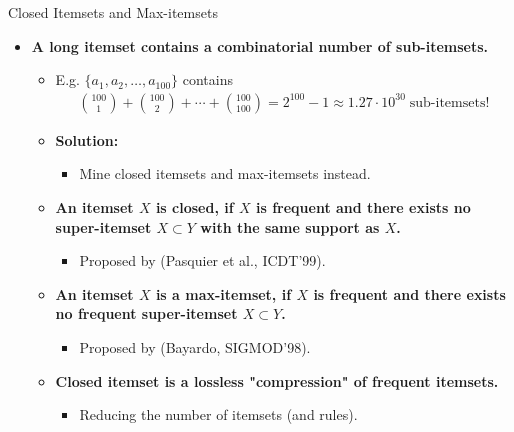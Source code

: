 \begin{frame}{Closed Itemsets and Max-itemsets}
	\begin{itemize}
		\item \textbf{A long itemset contains a combinatorial number of 
		sub-itemsets.}
		\begin{itemize}
			\item E.g. $\{a_1,a_2,\ldots,a_{100}\}$ contains
			\begin{align}
				{100\choose 1} + {100 \choose 2} + \cdots + {100 \choose 100} = 
				2^{100}-1 \approx 1.27 \cdot 10^{30} \; \text{sub-itemsets!} 
			\end{align}
			\item \textbf{Solution:}
			\begin{itemize}
				\item Mine closed itemsets and max-itemsets instead.
			\end{itemize}
			\item \textbf{An itemset $X$ is closed, if $X$ is frequent and 
			there exists no super-itemset $X \subset Y$ with the same support 
			as $X$.}
			\begin{itemize}
				\item Proposed by (Pasquier et al., ICDT'99).
			\end{itemize}
			\item \textbf{An itemset $X$ is a max-itemset, if $X$ is frequent 
			and there exists no frequent super-itemset $X \subset Y$.}
			\begin{itemize}
				\item Proposed by (Bayardo, SIGMOD'98).
			\end{itemize}
			\item \textbf{Closed itemset is a lossless "compression" of 
			frequent itemsets.}
			\begin{itemize}
				\item Reducing the number of itemsets (and rules).
			\end{itemize}
		\end{itemize}
	\end{itemize}
\end{frame}

